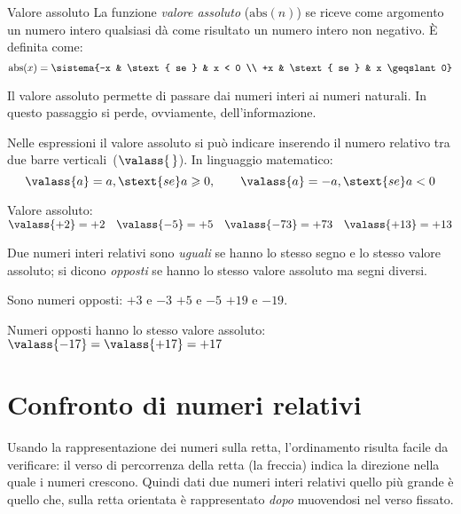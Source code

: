 \begin{definizione}{Valore assoluto}{}
La funzione \emph{valore assoluto}
(\(\mathrm{abs}(n)\)) se riceve come argomento 
un numero intero qualsiasi dà come risultato un numero intero non negativo.
È definita come:
\[\mathrm{abs}(x) = 
\sistema{-x & \stext{ se } & x < 0 \\ +x & \stext{ se } & x \geqslant 0}\]
\end{definizione}

Il valore assoluto permette di passare dai numeri interi ai numeri naturali. 
In questo passaggio si perde, ovviamente, dell'informazione.

Nelle espressioni il valore assoluto si può indicare inserendo il numero 
relativo tra due barre verticali~(\(\valass{\,}\)). In linguaggio matematico:
\[\valass{a}=a,\stext{ se }a\geqslant0,\qquad 
  \valass{a}=-a,\stext{ se }a<0\]

\begin{esempio}{}{}
Valore assoluto: \\
\(\valass{+2}=+2 \quad \valass{-5}=+5 \quad 
\valass{-73}=+73 \quad \valass{+13}=+13\)
\end{esempio}

\begin{definizione}{}{}
Due numeri interi relativi sono \emph{uguali} se hanno lo stesso segno e 
lo stesso valore assoluto;
si dicono \emph{opposti}
se hanno lo stesso valore assoluto ma segni diversi.
\end{definizione}

\begin{esempio}{}{}
Sono numeri opposti: \qquad \(+3\) e \(-3\) \quad \(+5\) e \(-5\) 
\quad \(+19\) e \(-19\).
\end{esempio}

Numeri opposti hanno lo stesso valore assoluto: \qquad 
\(\valass{-17} = \valass{+17} = +17\)

\section{Confronto di numeri relativi}
\label{sec:int_confronto}

Usando la rappresentazione dei numeri sulla retta, 
l'ordinamento risulta 
facile da verificare:
il verso di percorrenza della retta (la freccia) indica la direzione nella 
quale i numeri crescono.
Quindi dati due numeri interi relativi quello più grande è quello che, sulla 
retta orientata è rappresentato \emph{dopo} muovendosi nel verso fissato.

